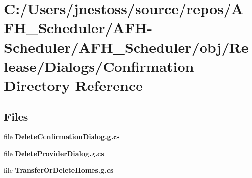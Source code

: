 \section{C\+:/\+Users/jnestoss/source/repos/\+A\+F\+H\+\_\+\+Scheduler/\+A\+F\+H-\/\+Scheduler/\+A\+F\+H\+\_\+\+Scheduler/obj/\+Release/\+Dialogs/\+Confirmation Directory Reference}
\label{dir_447d49c531d5da17933abe483deab742}
\subsection*{Files}
\begin{DoxyCompactItemize}
\item 
file \textbf{ Delete\+Confirmation\+Dialog.\+g.\+cs}
\item 
file \textbf{ Delete\+Provider\+Dialog.\+g.\+cs}
\item 
file \textbf{ Transfer\+Or\+Delete\+Homes.\+g.\+cs}
\end{DoxyCompactItemize}
